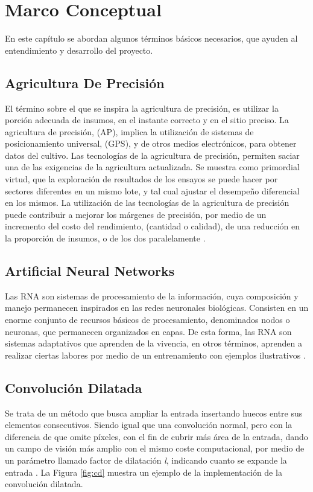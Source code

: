\chapter{Marco Conceptual}
En este capítulo se abordan algunos términos básicos necesarios, que ayuden al entendimiento y desarrollo del proyecto. 

\section{Agricultura De Precisión} El término sobre el que se inspira la agricultura de precisión, es utilizar la porción adecuada de insumos, en el instante correcto y en el sitio preciso. La agricultura de precisión, (AP), implica la utilización de sistemas de posicionamiento universal, (GPS), y de otros medios electrónicos, para obtener datos del cultivo. Las tecnologías de la agricultura de precisión, permiten saciar una de las exigencias de la agricultura actualizada. Se muestra como primordial virtud, que la exploración de resultados de los ensayos se puede hacer por sectores diferentes en un mismo lote, y tal cual ajustar el desempeño diferencial en los mismos. La utilización de las tecnologías de la agricultura de precisión puede contribuir a mejorar los márgenes de precisión, por medio de un incremento del costo del rendimiento, (cantidad o calidad), de una reducción en la proporción de insumos, o de los dos paralelamente \cite{ref_10}.

\section{Artificial Neural Networks} Las RNA son sistemas de procesamiento de la información, cuya composición y manejo permanecen inspirados en las redes neuronales biológicas. Consisten en un enorme conjunto de recursos básicos de procesamiento, denominados nodos o neuronas, que permanecen organizados en capas. De esta forma, las RNA son sistemas adaptativos que aprenden de la vivencia, en otros términos, aprenden a realizar ciertas labores por medio de un entrenamiento con ejemplos ilustrativos \cite{ref_11}.
\\ 

\section{Convolución Dilatada}

Se trata de un método que busca ampliar la entrada insertando huecos entre sus elementos consecutivos. Siendo igual que una convolución normal, pero con la diferencia de que omite píxeles, con el fin de cubrir más área de la entrada, dando un campo de visión más amplio con el mismo coste computacional, por medio de un parámetro llamado factor de dilatación \textit{l}, indicando cuanto se expande la entrada \cite{wu2019fastfcn}. La Figura \ref{fig:cd} muestra un ejemplo de la implementación de la convolución dilatada.

